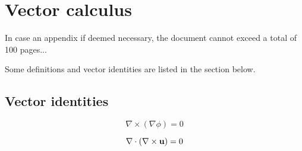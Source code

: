 
\chapter{Vector calculus}
\label{chapter:appendixVectors}

In case an appendix if deemed necessary, the document cannot exceed a total of 100 pages...

Some definitions and vector identities are listed in the section below.

\section{Vector identities}
\label{section:vectorIdentities}

\begin{equation}
	\nabla \times \left( \nabla \phi \right) = 0
	\label{eq:cross_nnp}
\end{equation}

\begin{equation}
	\nabla \cdot \left( \nabla \times {\bf u} \right) = 0
	\label{eq:dotCross_nnu}
\end{equation}

\cleardoublepage

